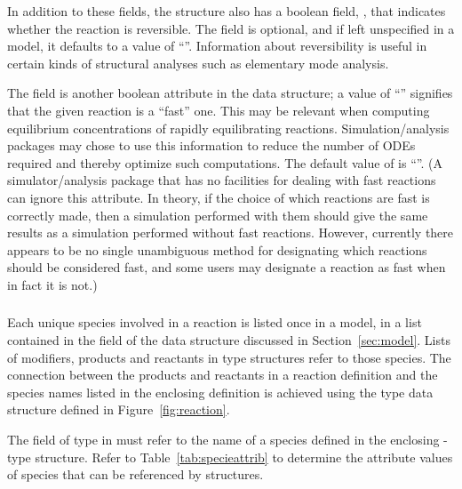 \documentclass[10pt,twocolumntoc]{cekarticle}
\newcommand{\vref}[1]{\ref{#1}}
\begin{document}
In addition to these fields, the  structure also has a
boolean field, , that indicates whether the reaction is
reversible.  The field is optional, and if left unspecified in a model, it
defaults to a value of ``''.  Information about
reversibility is useful in certain kinds of structural analyses such as
elementary mode analysis.

The field  is another boolean attribute in the
 data structure; a value of ``''
signifies that the given reaction is a ``fast'' one.  This may be relevant
when computing equilibrium concentrations of rapidly equilibrating
reactions.  Simulation/analysis packages may chose to use this information
to reduce the number of ODEs required and thereby optimize such
computations.  The default value of  is
``''.  (A simulator/analysis package that has no
facilities for dealing with fast reactions can ignore this attribute. In
theory, if the choice of which reactions are fast is correctly made, then a
simulation performed with them should give the same results as a simulation
performed without fast reactions.  However, currently there appears to be
no single unambiguous method for designating which reactions should be
considered fast, and some users may designate a reaction as fast when in
fact it is not.)

\subsubsection{}
\label{subsec:speciesreference}

Each unique species involved in a reaction is listed once in a
model, in a list contained in the  field of the
 data structure discussed in Section~\ref{sec:model}.
Lists of modifiers, products and reactants in 
type structures refer to those species.  The connection between
the products and reactants in a reaction definition and the
species names listed in the enclosing  definition is
achieved using the  type data structure
defined in Figure~\vref{fig:reaction}.

The field  of type  in
 must refer to the name of a species
defined in the enclosing -type structure.  Refer to Table~\ref{tab:specieattrib} to determine the attribute values of species that can be referenced by  structures.
\end{document}
